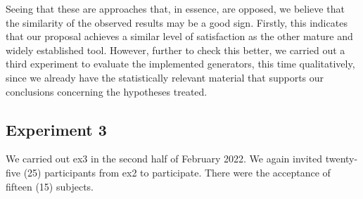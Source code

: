 Seeing that these are approaches that, in essence, are opposed, we believe that the similarity of the observed results may be a good sign.
Firstly, this indicates that our proposal achieves a similar level of satisfaction as the other mature and widely established tool.
However, further to check this better, we carried out a third experiment to evaluate the implemented generators, this time qualitatively, since we already have the statistically relevant material that supports our conclusions concerning the hypotheses treated.

\subsection{Experiment 3}
\label{ssec_experiments:Experiment3}

We carried out \ac{ex3} in the second half of February 2022.
We again invited twenty-five (25) participants from \ac{ex2} to participate.
There were the acceptance of fifteen (15) subjects.

